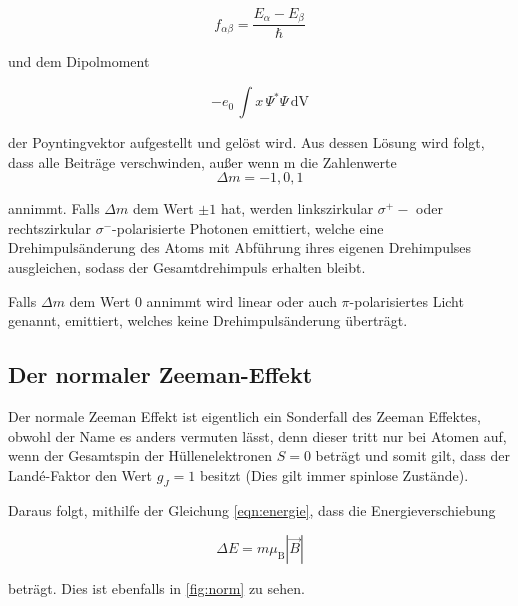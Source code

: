 \begin{equation}
    f_{\alpha\beta}= \frac{E_{\alpha} - E_{\beta}}{\hbar}
    \label{eqn:f}
  \end{equation}

\noindent
und dem Dipolmoment 

  \begin{equation}
    -e_0\, \int x \, \Psi^* \Psi \, \text{dV}
  \end{equation}

der Poyntingvektor aufgestellt und gelöst wird. Aus dessen Lösung wird folgt, dass alle Beiträge verschwinden, außer wenn m die Zahlenwerte
\begin{equation}
  \Delta m = -1,0,1
\end{equation}

\noindent
annimmt. Falls $\Delta m $ dem Wert $ \pm 1$ hat,  werden linkszirkular $\sigma^{+}-$ oder rechtszirkular $\sigma^{-}$-polarisierte
Photonen emittiert, welche eine Drehimpulsänderung des Atoms mit Abführung ihres eigenen Drehimpulses ausgleichen,
sodass der Gesamtdrehimpuls erhalten bleibt. 

\noindent
Falls $\Delta m $ dem Wert $0$ annimmt wird linear oder auch $\pi$-polarisiertes Licht genannt, emittiert,
welches keine Drehimpulsänderung überträgt.
 
\subsection{Der normaler Zeeman-Effekt}
Der normale Zeeman Effekt ist eigentlich ein Sonderfall des Zeeman Effektes, obwohl der Name es anders vermuten lässt, denn dieser tritt nur bei Atomen auf, wenn der 
Gesamtspin der Hüllenelektronen $S = 0$ beträgt und somit  gilt, dass der Landé-Faktor den Wert $g_J = 1$ besitzt (Dies gilt immer spinlose Zustände).

\noindent
Daraus folgt, mithilfe der Gleichung \ref{eqn:energie}, dass die Energieverschiebung 

\begin{equation}
    \Delta E = m \mu_\text{B} |\vec{B}| 
\end{equation}

\noindent
beträgt. Dies ist ebenfalls in \autoref{fig:norm} zu sehen.

